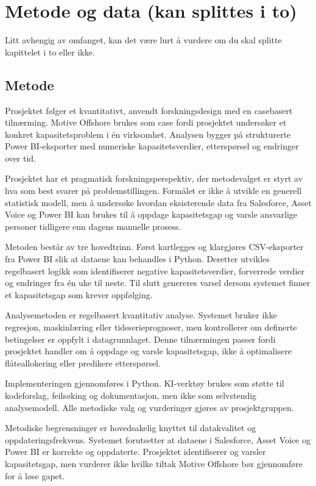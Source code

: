 \documentclass[a4paper,11pt]{article}
\begin{document}
\section{Metode og data (kan splittes i to)}

Litt avhengig av omfanget, kan det være lurt å vurdere om du skal splitte kapittelet i to eller ikke.

\subsection{Metode}

Prosjektet følger et kvantitativt, anvendt forskningsdesign med en casebasert tilnærming. Motive Offshore brukes som case fordi prosjektet undersøker et konkret kapasitetsproblem i én virksomhet. Analysen bygger på strukturerte Power BI-eksporter med numeriske kapasitetsverdier, etterspørsel og endringer over tid.

Prosjektet har et pragmatisk forskningsperspektiv, der metodevalget er styrt av hva som best svarer på problemstillingen. Formålet er ikke å utvikle en generell statistisk modell, men å undersøke hvordan eksisterende data fra Salesforce, Asset Voice og Power BI kan brukes til å oppdage kapasitetsgap og varsle ansvarlige personer tidligere enn dagens manuelle prosess.

Metoden består av tre hovedtrinn. Først kartlegges og klargjøres CSV-eksporter fra Power BI slik at dataene kan behandles i Python. Deretter utvikles regelbasert logikk som identifiserer negative kapasitetsverdier, forverrede verdier og endringer fra én uke til neste. Til slutt genereres varsel dersom systemet finner et kapasitetsgap som krever oppfølging.

Analysemetoden er regelbasert kvantitativ analyse. Systemet bruker ikke regresjon, maskinlæring eller tidsserieprognoser, men kontrollerer om definerte betingelser er oppfylt i datagrunnlaget. Denne tilnærmingen passer fordi prosjektet handler om å oppdage og varsle kapasitetsgap, ikke å optimalisere flåteallokering eller predikere etterspørsel.

Implementeringen gjennomføres i Python. KI-verktøy brukes som støtte til kodeforslag, feilsøking og dokumentasjon, men ikke som selvstendig analysemodell. Alle metodiske valg og vurderinger gjøres av prosjektgruppen.

Metodiske begrensninger er hovedsakelig knyttet til datakvalitet og oppdateringsfrekvens. Systemet forutsetter at dataene i Salesforce, Asset Voice og Power BI er korrekte og oppdaterte. Prosjektet identifiserer og varsler kapasitetsgap, men vurderer ikke hvilke tiltak Motive Offshore bør gjennomføre for å løse gapet.
\end{document}
